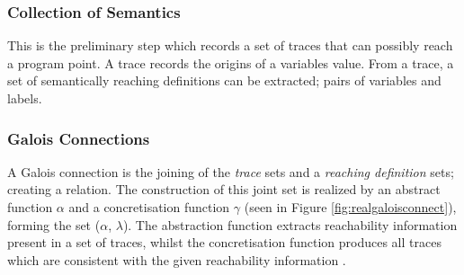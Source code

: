 {			\subsubsection*{Collection of Semantics}
			\par This is the preliminary step which records a set of traces that can possibly reach a program point. A trace records the origins of a variables value.
			From a trace, a set of semantically reaching definitions can be extracted; pairs of variables and labels.
			
			\subsubsection*{Galois Connections}
			\par A Galois connection is the joining of the \textit{trace} sets and a \textit{reaching definition} sets; creating a relation. The construction of this joint set is realized by an abstract function $\alpha$
			and a concretisation function $\gamma$ (seen in Figure \ref{fig:realgaloisconnect}), forming the set ($\alpha$, $\lambda$). The abstraction function extracts reachability information present 
			in a set of traces, whilst the concretisation function produces all traces which are consistent with the given reachability information \cite[pp.14--15]{nielson2004principlesofPA}.
			
			\begin{figure}
				\centering 
\end{figure}}
